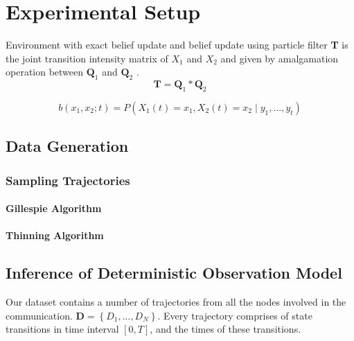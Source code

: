 \chapter{Experimental Setup}

Environment with exact belief update and belief update using particle filter
\textbf{T} is the joint transition intensity matrix of $ X_{1} $ and $ X_{2} $ and given by amalgamation operation between $ \textbf{Q}_{1} $ and  $ \textbf{Q}_{2} $ \cite{Nodelman1995}.
\begin{equation}
\textbf{T} = \textbf{Q}_{1} * \textbf{Q}_{2}
\end{equation}


\begin{equation}
b(x_{1}, x_{2}; t) = P( X_{1}(t) = x_{1},  X_{2}(t) = x_{2}\mid y_{1}, ..., y_{t})
\end{equation}

\section{Data Generation}
\subsection{Sampling Trajectories}
\subsubsection{Gillespie Algorithm}
\subsubsection{Thinning Algorithm}
\section{Inference of Deterministic Observation Model}
Our dataset contains a number of trajectories from all the nodes involved in the communication. $ \textbf{D} = \left\lbrace D_{1},..., D_{N}\right\rbrace $. Every trajectory comprises of state transitions in time interval $  [0, T] $, and the times of these transitions.
